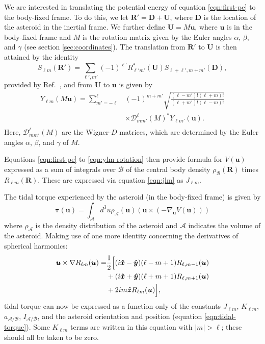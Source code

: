We are interested in translating the potential energy of equation \ref{eqn:first-pe} to the body-fixed frame. To do this, we let $\bm{R'} = \bm D + \bm U$, where $\bm D$ is the location of the asteroid in the inertial frame. We further define $\bm U = M\bm u$, where $\bm u$ is in the body-fixed frame and $M$ is the rotation matrix given by the Euler angles $\alpha$, $\beta$, and $\gamma$ (see section \ref{sec:coordinates}). The translation from $\bm {R'}$ to $\bm U$ is then attained by the identity 
\begin{equation}
  S_{\ell m}(\bm R') = \sum_{\ell', m'} (-1)^{\ell'}R^*_{\ell' m'}(\bm U)S_{\ell+\ell', m + m'} (\bm D),
  \label{eqn:ylm-translation}
\end{equation}  
provided by Ref.~\cite{Gelderen1998TheSO}, and from $\bm U$ to $\bm u$ is given by
\begin{equation}
  \begin{split}
    Y_{\ell m}(M\bm u) = \sum_{m'=-\ell}^\ell & (-1)^{m+m'}\sqrt{\frac{(\ell-m')!(\ell+m)!}{(\ell+m')!(\ell-m)!}} \\
    & \times \mathcal{D}^\ell_{mm'}(M)^* Y_{\ell m'}(\bm u).\\
  \end{split}
  \label{eqn:ylm-rotation}
\end{equation}
Here, $\mathcal{D}^\ell_{mm'}(M)$ are the Wigner-$D$ matrices, which are determined by the Euler angles $\alpha$, $\beta$, and $\gamma$ of $M$.

Equations \ref{eqn:first-pe} to \ref{eqn:ylm-rotation} then provide formula for $V(\bm u)$ expressed as a sum of integrals over $\mathcal{B}$ of the central body density $\rho_\mathcal{B}(\bm R)$ times $R_{\ell m}(\bm R)$. These are expressed via equation \ref{eqn:jlm} as $J_{\ell m}$.

The tidal torque experienced by the asteroid (in the body-fixed frame) is given by
\begin{equation}
  \bm{\tau}(\bm u) = \int_\mathcal{A} d^3 u \rho_\mathcal{A}(\bm u) (\bm u \times (-\nabla_{\bm u} V(\bm u)))
\end{equation}
where $\rho_\mathcal{A}$ is the density distribution of the asteroid and $\mathcal{A}$ indicates the volume of the asteroid. Making use of one more identity concerning the derivatives of spherical harmonics:
\begin{equation}
  \begin{split}
  \bm u \times \nabla R_{\ell m}(\bm u)=&\frac{1}{2}\Big[(i\bm{\hat{x}} - \bm{\hat{y}})(\ell-m+1)R_{\ell,m-1}(\bm u)\\
  &+(i\bm{\hat{x}}+\bm{\hat{y}})(\ell+m+1)R_{\ell,m+1}(\bm u)\\
  & +2im\bm{\hat{z}} R_{\ell m}(\bm u)\Big],
  \end{split}
\end{equation}
tidal torque can now be expressed as a function only of the constants $J_{\ell m}$, $K_{\ell m}$, $a_\mathcal{A/B}$, $I_\mathcal{A/B}$, and the asteroid orientation and position (equation \ref{eqn:tidal-torque}). Some $K_{\ell m}$ terms are written in this equation with $|m|>\ell$; these should all be taken to be zero.

